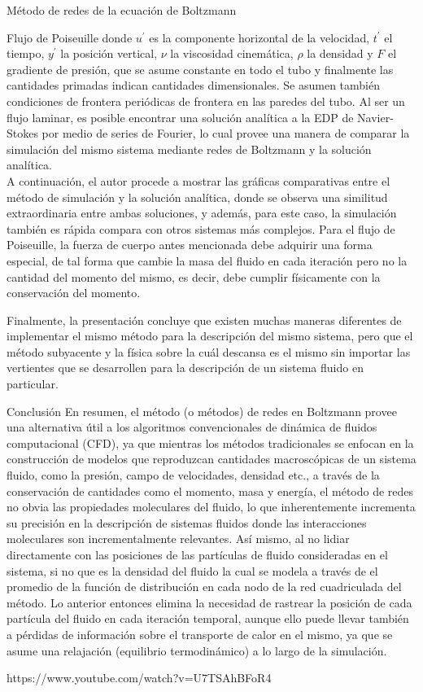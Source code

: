 \documentclass[12pt]{article}
\begin{document}
\begin {section} {Método de redes de la ecuación de Boltzmann}
\begin {subsection} {Flujo de Poiseuille}
donde $u^{\prime}$ es la componente horizontal de la velocidad, $t^{\prime}$ el tiempo, $y^{\prime}$ la posición vertical, $\nu$ la viscosidad cinemática, $\rho$ la densidad y $F$ el gradiente de presión, que se asume constante en todo el tubo y finalmente las cantidades primadas indican cantidades dimensionales. Se asumen también condiciones de frontera periódicas de frontera en las paredes del tubo. Al ser un flujo laminar, es posible encontrar una solución analítica a la EDP de Navier-Stokes por medio de series de Fourier, lo cual provee una manera de comparar la simulación del mismo sistema mediante redes de Boltzmann y la solución analítica. 
\\
A continuación, el autor procede a mostrar las gráficas comparativas entre el método de simulación y la solución analítica, donde se observa una similitud extraordinaria entre ambas soluciones, y además, para este caso, la simulación también es rápida compara con otros sistemas más complejos. Para el flujo de Poiseuille, la fuerza de cuerpo antes mencionada debe adquirir una forma especial, de tal forma que cambie la masa del fluido en cada iteración pero no la cantidad del momento del mismo, es decir, debe cumplir físicamente con la conservación del momento. 
\end {subsection}
Finalmente, la presentación concluye que existen muchas maneras diferentes de implementar el mismo método para la descripción del mismo sistema, pero que el método subyacente y la física sobre la cuál descansa es el mismo sin importar las vertientes que se desarrollen para la descripción de un sistema fluido en particular. 
\end {section}

\begin {section} {Conclusión}
En resumen, el método (o métodos) de redes en Boltzmann provee una alternativa útil a los algoritmos convencionales de dinámica de fluidos computacional (CFD), ya que mientras los métodos tradicionales se enfocan en la construcción de modelos que reproduzcan cantidades macroscópicas de un sistema fluido, como la presión, campo de velocidades, densidad etc., a través de la conservación de cantidades como el momento, masa y energía, el método de redes no obvia las propiedades moleculares del fluido, lo que inherentemente incrementa su precisión en la descripción de sistemas fluidos donde las interacciones moleculares son incrementalmente relevantes. Así mismo, al no lidiar directamente con las posiciones de las partículas de fluido consideradas en el sistema, si no que es la densidad del fluido la cual se modela a través de el promedio de la función de distribución en cada nodo de la red cuadriculada del método. Lo anterior entonces elimina la necesidad de rastrear la posición de cada partícula del fluido en cada iteración temporal, aunque ello puede llevar también a pérdidas de información sobre el transporte de calor en el mismo, ya que se asume una relajación (equilibrio termodinámico) a lo largo de la simulación.
\end {section}

\begin{thebibliography}{99}
https://www.youtube.com/watch?v=U7TSAhBFoR4

\end {thebibliography}
\end{document}
